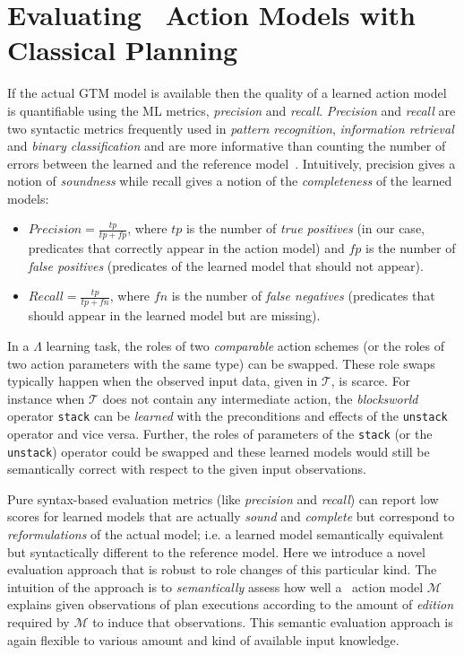 \section{Evaluating \strips\ Action Models with Classical Planning}
\label{sec:evaluation}

If the actual GTM model is available then the quality of a learned action model is quantifiable using the ML metrics, {\em precision} and {\em recall}. {\em Precision} and {\em recall} are two syntactic metrics frequently used in {\em pattern recognition}, {\em information retrieval} and {\em binary classification} and are more informative than counting the number of errors between the learned and the reference model~\cite{davis2006relationship}. Intuitively, precision gives a notion of {\em soundness} while recall gives a notion of the {\em completeness} of the learned models:
\begin{itemize}
\item $Precision=\frac{tp}{tp+fp}$, where $tp$ is the number of {\em true positives} (in our case, predicates that correctly appear in the action model) and $fp$ is the number of {\em false positives} (predicates of the learned model that should not appear).
\item $Recall=\frac{tp}{tp+fn}$, where $fn$ is the number of {\em false negatives} (predicates that should appear in the learned model but are missing).
\end{itemize}

In a $\Lambda$ learning task, the roles of two {\em comparable} action schemes (or the roles of two action parameters with the same type) can be swapped. These role swaps typically happen when the observed input data, given in $\mathcal{T}$, is scarce. For instance when $\mathcal{T}$ does not contain any intermediate action, the {\em blocksworld} operator {\small\tt stack} can be {\em learned} with the preconditions and effects of the {\small\tt unstack} operator and vice versa. Further, the roles of parameters of the {\small\tt stack} (or the {\small\tt unstack}) operator could be swapped and these learned models would still be semantically correct with respect to the given input observations.

Pure syntax-based evaluation metrics (like {\em precision} and {\em recall}) can report low scores for learned models that are actually {\em sound} and {\em complete} but correspond to {\em reformulations} of the actual model; i.e. a learned model semantically equivalent but syntactically different to the reference model. Here we introduce a novel evaluation approach that is robust to role changes of this particular kind. The intuition of the approach is to {\em semantically} assess how well a \strips\ action model $\mathcal{M}$ explains given observations of plan executions according to the amount of {\em edition} required by $\mathcal{M}$ to induce that observations. This semantic evaluation approach is again flexible to various amount and kind of available input knowledge.

